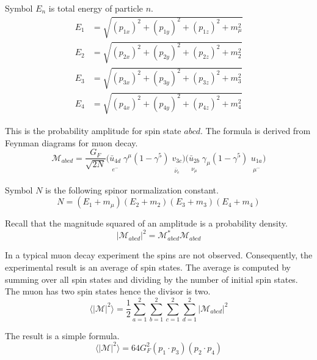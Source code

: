 \documentclass[12pt]{article}
\begin{document}
Symbol $E_n$ is total energy of particle $n$.
\begin{align*}
E_1&=\sqrt{(p_{1x})^2+(p_{1y})^2+(p_{1z})^2+m_\mu^2}
\\
E_2&=\sqrt{(p_{2x})^2+(p_{2y})^2+(p_{2z})^2+m_2^2}
\\
E_3&=\sqrt{(p_{3x})^2+(p_{3y})^2+(p_{3z})^2+m_3^2}
\\
E_4&=\sqrt{(p_{4x})^2+(p_{4y})^2+(p_{4z})^2+m_4^2}
\end{align*}

This is the probability amplitude for spin state $abcd$.
The formula is derived from Feynman diagrams for muon decay.
\begin{equation*}
\mathcal{M}_{abcd}=\frac{G_F}{\sqrt{2N}}
\bigl(
\underset{\substack{\\[1ex]e^-}}{\bar{u}_{4d}}
\;
\underset{\substack{\\[1ex] }}{\gamma^\mu(1-\gamma^5)}
\;
\underset{\substack{\\[1ex]\bar{\nu}_e}}{v_{3c}}
\bigr)
\bigl(
\underset{\substack{\\[1ex]\nu_\mu}}{\bar{u}_{2b}}
\;
\underset{\substack{\\[1ex] }}{\gamma_\mu(1-\gamma^5)}
\;
\underset{\substack{\\[1ex]\mu^-}}{u_{1a}}
\bigr)
\end{equation*}

Symbol $N$ is the following spinor normalization constant.
\begin{equation*}
N=(E_1+m_\mu)(E_2+m_2)(E_3+m_3)(E_4+m_4)
\end{equation*}

Recall that the magnitude squared of an amplitude is a probability density.
\begin{equation*}
|\mathcal{M}_{abcd}|^2=\mathcal{M}_{abcd}^*\mathcal{M}_{abcd}
\end{equation*}

In a typical muon decay experiment the spins are not observed.
Consequently, the experimental result is an average of spin states.
The average is computed by summing over all spin states and dividing by the number of initial spin states.
The muon has two spin states hence the divisor is two.
\begin{equation*}
\langle|\mathcal{M}|^2\rangle=
\frac{1}{2}
\sum_{a=1}^2\sum_{b=1}^2\sum_{c=1}^2\sum_{d=1}^2
|\mathcal{M}_{abcd}|^2
\end{equation*}

The result is a simple formula.
\begin{equation*}
\langle|\mathcal{M}|^2\rangle=64G_F^2(p_1\cdot p_3)(p_2\cdot p_4)
\tag{1}
\end{equation*}
\end{document}
